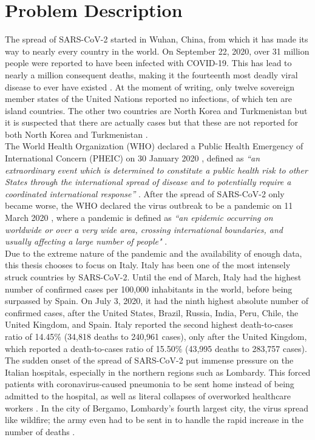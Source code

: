 \documentclass[12pt]{article}
\begin{document}
	\section{Problem Description} \label{sec:problem_description}
	The spread of SARS-CoV-2 started in Wuhan, China, from which it has made its way to nearly every country in the world. On September 22, 2020, over 31 million people were reported to have been infected with COVID-19. This has lead to nearly a million consequent deaths, making it the fourteenth most deadly viral disease to ever have existed \parencite{lepan2020historyPandemics}. At the moment of writing, only twelve sovereign member states of the United Nations reported no infections, of which ten are island countries. The other two countries are North Korea and Turkmenistan but it is suspected that there are actually cases but that these are not reported for both North Korea \parencite{nebehay2020dprk} and Turkmenistan \parencite{hrw2020turkmenistan}. \\
	
	The World Health Organization (WHO) declared a Public Health Emergency of International Concern (PHEIC) on 30 January 2020 \parencite{who2020pheic}, defined as \textit{``an extraordinary event which is determined to constitute a public health risk to other States through the international spread of disease and to potentially require a coordinated international response”} \parencite{who2019ihr}. After the spread of SARS-CoV-2 only became worse, the WHO declared the virus outbreak to be a pandemic on 11 March 2020 \parencite{who2020pandemic}, where a pandemic is defined as \textit{``an epidemic occurring on worldwide or over a very wide area, crossing international boundaries, and usually affecting a large number of people"} \parencite{porta2014dictionary}. \\
	
	Due to the extreme nature of the pandemic and the availability of enough data, this thesis chooses to focus on Italy. Italy has been one of the most intensely struck countries by SARS-CoV-2. Until the end of March, Italy had the highest number of confirmed cases per 100,000 inhabitants in the world, before being surpassed by Spain. On July 3, 2020, it had the ninth highest absolute number of confirmed cases, after the United States, Brazil, Russia, India, Peru, Chile, the United Kingdom, and Spain. Italy reported the second highest death-to-cases ratio of 14.45\% (34,818 deaths to 240,961 cases), only after the United Kingdom, which reported a death-to-cases ratio of 15.50\% (43,995 deaths to 283,757 cases). The sudden onset of the spread of SARS-CoV-2 put immense pressure on the Italian hospitals, especially in the northern regions such as Lombardy. This forced patients with coronavirus-caused pneumonia to be sent home instead of being admitted to the hospital, as well as literal collapses of overworked healthcare workers \parencite{horowitz2020healthcare}. In the city of Bergamo, Lombardy's fourth largest city, the virus spread like wildfire; the army even had to be sent in to handle the rapid increase in the number of deaths \parencite{scarr2020bergamo}. \\
	
\end{document}
